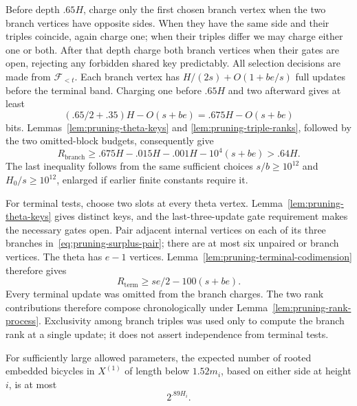 Before depth $.65H$, charge only the first chosen branch vertex when
the two branch vertices have opposite sides.  When they have the same
side and their triples coincide, again charge one; when their
triples differ we may charge either one or both.  After that
depth charge both branch vertices when their gates are open, rejecting
any forbidden shared key predictably.  All selection decisions
are made from $\mathcal F_{<t}$.  Each branch vertex has
$H/(2s)+O(1+be/s)$ full updates before the terminal band.  Charging
one before $.65H$ and two afterward gives at least
\[
  (.65/2+.35)H-O(s+be)=.675H-O(s+be)
\]
bits.  Lemmas~\ref{lem:pruning-theta-keys} and
\ref{lem:pruning-triple-ranks}, followed by the two omitted-block
budgets, consequently give
\begin{equation}
\label{eq:pruning-branch-budget}
 R_{\mathrm{branch}}
 \geq .675H-.015H-.001H-10^4(s+be)>.64H.
\end{equation}
The last inequality follows from the same sufficient choices
$s/b\geq10^{12}$ and $H_0/s\geq10^{12}$, enlarged if earlier
finite constants require it.

For terminal tests, choose two slots at every theta vertex.
Lemma~\ref{lem:pruning-theta-keys} gives distinct keys, and the
last-three-update gate requirement makes the necessary gates
open.  Pair adjacent internal vertices on each of its three
branches in~\eqref{eq:pruning-surplus-pair}; there are at most
six unpaired or branch vertices.  The theta has $e-1$ vertices.
Lemma~\ref{lem:pruning-terminal-codimension} therefore gives
\begin{equation}
\label{eq:pruning-theta-terminal}
 R_{\mathrm{term}}
 \geq se/2-100(s+be).
\end{equation}
Every terminal update was omitted from the branch charges.  The two
rank contributions therefore compose chronologically under
Lemma~\ref{lem:pruning-rank-process}.  Exclusivity among branch triples
was used only to compute the branch rank at a single update; it does
not assert independence from terminal tests.

\begin{lemma}
\label{lem:pruning-theta-count}
For sufficiently large allowed parameters, the expected number
of rooted embedded bicycles in $X^{(1)}$ of length below
$1.52m_i$, based on either side at height $i$, is at most
\[
 2^{.89H_i}.
\]
\end{lemma}

